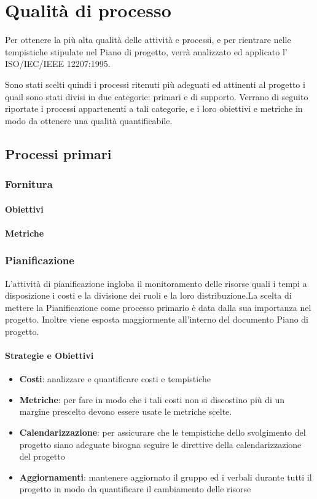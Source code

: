 \section{Qualità di processo}
Per ottenere la più alta qualità delle attività e processi, e per rientrare nelle tempistiche stipulate nel Piano di progetto, verrà analizzato ed applicato l' ISO/IEC/IEEE 12207:1995.

Sono stati scelti quindi i processi ritenuti più adeguati ed attinenti al progetto i quail sono stati divisi in due categorie: primari e di supporto. Verrano di seguito riportate i processi appartenenti a tali categorie, e i loro obiettivi e metriche in modo da ottenere una qualità quantificabile.
    \subsection{Processi primari}
        \subsubsection{Fornitura}
            \paragraph{Obiettivi}
            \paragraph{Metriche}
            
        \subsubsection{Pianificazione}
        L'attività di pianificazione ingloba il monitoramento delle risorse quali i tempi a disposizione i costi e la divisione dei ruoli e la loro distribuzione.La scelta di mettere la Pianificazione come processo primario è data dalla sua importanza nel progetto. Inoltre viene esposta maggiormente all'interno del documento Piano di progetto.
            \paragraph{Strategie e Obiettivi}
                \begin{itemize}
                    \item \textbf{Costi}: analizzare e quantificare costi e tempistiche
                    \item \textbf{Metriche}: per fare in modo che i  tali costi non si discostino più di un margine prescelto devono essere usate le metriche scelte.
                    \item \textbf{Calendarizzazione}: per assicurare che le tempistiche dello svolgimento del progetto siano adeguate bisogna seguire le direttive della calendarizzazione del progetto
                    \item \textbf{Aggiornamenti}: mantenere aggiornato il gruppo ed i verbali durante tutti il progetto in modo da quantificare il cambiamento delle risorse
                \end{itemize}
                

